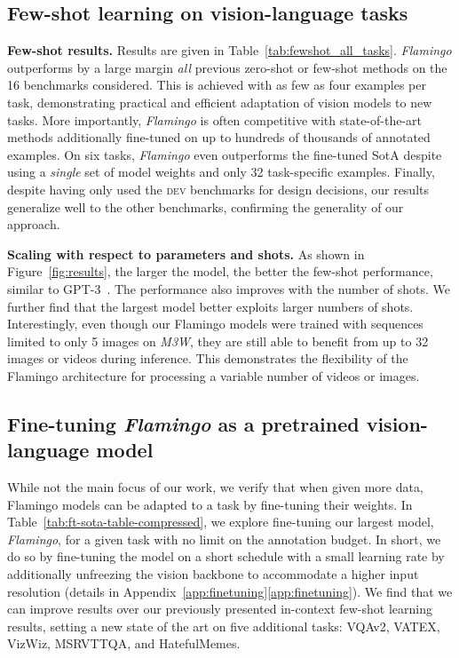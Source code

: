 \subsection{Few-shot learning on vision-language tasks}
\label{sec:fewshot_openended}

\textbf{Few-shot results.} Results are given in Table~\ref{tab:fewshot_all_tasks}.
\emph{Flamingo} outperforms by a large margin \emph{all} previous zero-shot or few-shot methods on the 16 benchmarks considered. This is achieved with as few as four examples per task, demonstrating practical and efficient adaptation of vision models to new tasks. More importantly, \emph{Flamingo} is often competitive with state-of-the-art methods additionally fine-tuned on up to hundreds of thousands of annotated examples. On six tasks, \emph{Flamingo} even outperforms the fine-tuned SotA despite using a \emph{single} set of model weights and only 32 task-specific examples. Finally, despite having only used the \textsc{dev} benchmarks for design decisions, our results generalize well to the other benchmarks, confirming the generality of our approach.

\textbf{Scaling with respect to parameters and shots.} As shown in Figure~\ref{fig:results}, the larger the model, the better the few-shot performance, similar to GPT-3~\citep{gpt3}. The performance also improves with the number of shots. We further find that the largest model better exploits larger numbers of shots. Interestingly, even though our Flamingo models were trained with sequences limited to only 5 images on \emph{M3W}, they are still able to benefit from up to 32 images or videos during inference. This demonstrates the flexibility of the Flamingo architecture for processing a variable number of videos or images.

\subsection{Fine-tuning \emph{Flamingo} as a pretrained vision-language model}
\label{sec:ft_results}

While not the main focus of our work, we verify that when given more data, Flamingo models can be adapted to a task by fine-tuning their weights. In Table~\ref{tab:ft-sota-table-compressed}, we explore fine-tuning our largest model, \emph{Flamingo}, for a given task with no limit on the annotation budget. In short, we do so by fine-tuning the model on a short schedule with a small learning rate by additionally unfreezing the vision backbone to accommodate a higher input resolution (details in Appendix~\ifwithappendix\ref{app:finetuning}\else\ref*{app:finetuning}\fi).
We find that we can improve results over our previously presented in-context few-shot learning results, setting a new state of the art on five additional tasks: VQAv2, VATEX, VizWiz, MSRVTTQA, and HatefulMemes.

